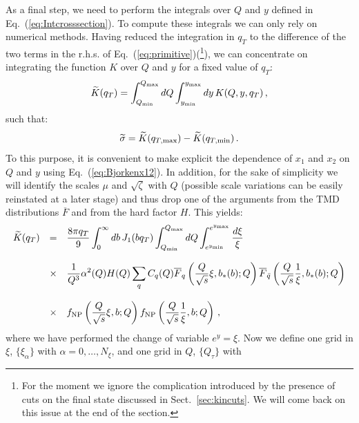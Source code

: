 \documentclass[10pt,a4paper]{article}
\begin{document}
As a final step, we need to perform the integrals over $Q$ and $y$
defined in Eq.~(\ref{eq:Intcrosssection}). To compute these integrals
we can only rely on numerical methods. Having reduced the integration
in $q_T$ to the difference of the two terms in the r.h.s. of
Eq.~(\ref{eq:primitive})(\footnote{For the moment we ignore the
  complication introduced by the presence of cuts on the final state
  discussed in Sect.~\ref{sec:kincuts}. We will come back on this
  issue at the end of the section.}), we can concentrate on
integrating the function $K$ over $Q$ and $y$ for a fixed value of
$q_T$:
\begin{equation}\label{eq:integralK}
\widetilde{K}(q_T)=\int_{Q_{\rm min}}^{Q_{\rm max}}dQ \int_{y_{\rm
    min}}^{y_{\rm max}}dy\,K(Q,y,q_T)\,,
\end{equation}
such that:
\begin{equation}
  \widetilde{\sigma} = \widetilde{K} (q_{T,\rm max})- \widetilde{K} (q_{T,\rm min})\,.
\end{equation}
To this purpose, it is convenient to make explicit the dependence of
$x_1$ and $x_2$ on $Q$ and $y$ using Eq.~(\ref{eq:Bjorkenx12}). In
addition, for the sake of simplicity we will identify the scales $\mu$
and $\sqrt{\zeta}$ with $Q$ (possible scale variations can be easily
reinstated at a later stage) and thus drop one of the arguments from
the TMD distributions $\overline{F}$ and from the hard factor $H$.
This yields:
\begin{equation}\label{eq:finalintegral}
\begin{array}{rcl}
\displaystyle  \widetilde{K}(q_T) &=& \displaystyle \frac{8\pi q_T}{9} \int_0^\infty db\, J_1(bq_T)
  \int_{Q_{\rm min}}^{Q_{\rm max}}
  dQ \int_{e^{y_{\rm
    min}}}^{e^{y_{\rm max}}}\frac{d\xi}{\xi}\\
\\
&\times& \displaystyle 
                         \frac{1}{Q^3} \alpha^2(Q) H(Q)\sum_q C_q(Q)\overline{F}_q\left(\frac{Q}{\sqrt{s}}\xi,b_*(b);Q\right)
                         \overline{F}_{\bar{q}}\left(\frac{Q}{\sqrt{s}}\frac1{\xi},b_*(b);Q\right) \\
\\
&\times& \displaystyle f_{\rm NP}\left(\frac{Q}{\sqrt{s}}\xi,b;Q\right)
  f_{\rm NP}\left(\frac{Q}{\sqrt{s}}\frac1{\xi},b;Q\right)\,,
\end{array}
\end{equation}
where we have performed the change of variable $e^{y} = \xi$. Now we
define one grid in $\xi$, $\{\xi_\alpha\}$ with
$\alpha=0,\dots,N_\xi$, and one grid in $Q$, $\{Q_\tau\}$ with
\end{document}
